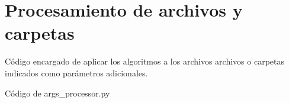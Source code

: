\section{Procesamiento de archivos y carpetas}
Código encargado de aplicar los algoritmos a los archivos archivos o
carpetas indicados como parámetros adicionales.
\begin{codigo_python}
  \caption{Código de args\_processor.py}
  \inputminted[fontsize=\scriptsize, linenos,
  breaklines]{python}{../OpenCV/args_processor.py}
\end{codigo_python}
